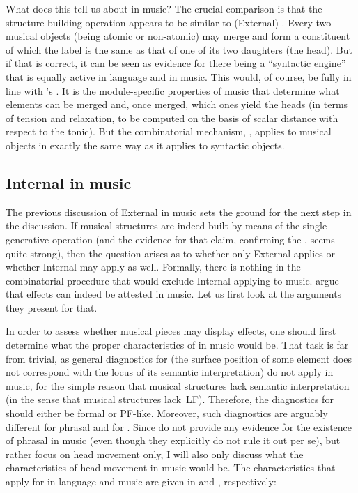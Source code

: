 \documentclass[output=paper]{langsci/langscibook}
\begin{document}
What does this tell us about  in music? The crucial comparison is
that the structure-building operation appears to be similar to (External)
. Every two musical objects (being atomic or non-atomic) may merge
and form a constituent of which the label is the same as that of one of its two
daughters (the head). But if that is correct, it can be seen as evidence for
there being a \enquote{syntactic engine} that is equally active in language and in
music. This would, of course, be fully in line with \citeauthor{KatzPes2011}’s
. It is the module-specific
properties of music that determine what elements can be merged and, once
merged, which ones yield the heads (in terms of tension and relaxation, to be
computed on the basis of scalar distance with respect to the tonic). But the
combinatorial mechanism, , applies to musical objects in exactly the same
way as it applies to syntactic objects.

\subsection{Internal  in music}\label{sec:26.3.3}

The previous discussion of External  in music sets the ground for
the next step in the discussion. If musical structures are indeed built by
means of the single generative operation  (and the evidence for that
claim, confirming the , seems quite
strong), then the question arises as to whether only External 
applies or whether Internal  may apply as well. Formally, there is nothing
in the combinatorial procedure that would exclude Internal  applying
to music. \citeauthor{KatzPes2011} argue that  effects can indeed
be attested in music. Let us first look at the arguments they present for that.

In order to assess whether musical pieces may display  effects, one
should first determine what the proper characteristics of  in music
would be. That task is far from trivial, as general diagnostics for 
(the surface position of some element does not correspond with the locus of its
semantic interpretation) do not apply in music, for the simple reason that
musical structures lack semantic interpretation (in the sense that musical
structures lack~\gls{LF}). Therefore, the diagnostics for  should
either be formal or PF-like. Moreover, such diagnostics are arguably different
for phrasal  and for . Since \citeauthor{KatzPes2011} do
not provide any evidence for the existence of phrasal  in music (even
though they explicitly do not rule it out per se), but rather focus on head
movement only, I will also only discuss what the characteristics of head
movement in music would be. The characteristics that \citeauthor{KatzPes2011}
apply for  in language and music are given in 
and , respectively:
\end{document}
